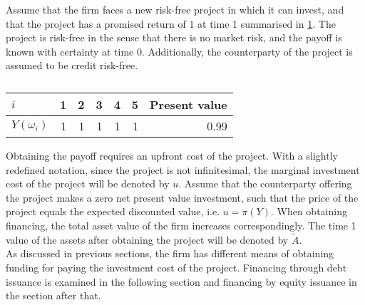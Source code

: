 \documentclass[main.tex]{subfiles}
\begin{document}
    Assume that the firm faces a new risk-free project in which it can invest,
    and that the project has a promised return of $\num{1}$ at time 1 summarised in \cref{tbl:single-period-simple-derivative-payoff}.
    The project is risk-free in the sense that there is no market risk,
    and the payoff is known with certainty at time 0.
    Additionally, the counterparty of the project is assumed to be credit risk-free.
        \begin{table}[H]
            \centering
            \begin{tabular}{l|rrrrr||r}
                $i$ & 1 & 2 & 3 & 4 & 5 & Present value\\
                \hline
                $Y(\omega_{i})$ & 
                    \num{1} & \num{1} & \num{1} & \num{1} & \num{1} & \num{0.99}
            \end{tabular}
            \caption{}
            \label{tbl:single-period-simple-derivative-payoff}
        \end{table}
    Obtaining the payoff requires an upfront cost of the project.
    With a slightly redefined notation, since the project is not infinitesimal,
    the marginal investment cost of the project will be denoted by $u$.
    Assume that the counterparty offering the project makes a zero net present value investment, 
    such that the price of the project equals the expected discounted value, i.e. $u = \pi(Y)$.
    When obtaining financing, the total asset value of the firm increases correspondingly.
    The time 1 value of the assets after obtaining the project will be denoted by $\tilde{A}$.
    \\
    As discussed in previous sections, the firm has different means of obtaining funding
    for paying the investment cost of the project.
    Financing through debt issuance is examined in the following section 
    and financing by equity issuance in the section after that.
\end{document}
